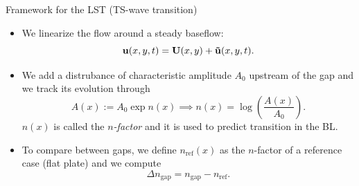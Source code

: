 \documentclass[aspectratio=43, xcolor=table]{beamer}
\begin{document}
\begin{frame}{Framework for the LST (TS-wave transition)}


	\begin{itemize}
		\item We linearize the flow around a steady baseflow:
		      $$\boldsymbol{\mathrm{u}}(x,y,t) = \boldsymbol{\mathrm{U}}(x,y)+ \boldsymbol{\mathrm{\tilde{u}}}(x,y,t).$$
	\end{itemize}
	\pause
	\begin{itemize}
		\item We add a distrubance of characteristic amplitude $A_0$ upstream of the gap and we track its evolution through
			$$
			A(x) := A_0\exp{n(x)} \implies n(x) = \log\left(\frac{A(x)}{A_0}\right).
			$$
		$n(x)$ is called the \textit{$n$-factor} and it is used to predict transition in the BL.
	\end{itemize}
	\pause
	\begin{itemize}
		\item To compare between gaps, we define $n_\text{ref}(x)$ as the $n$-factor of a reference case (flat plate) and we compute
			$$\Delta n_\text{gap} = n_\text{gap} - n_\text{ref}.$$
	\end{itemize}
\end{frame}
\end{document}
